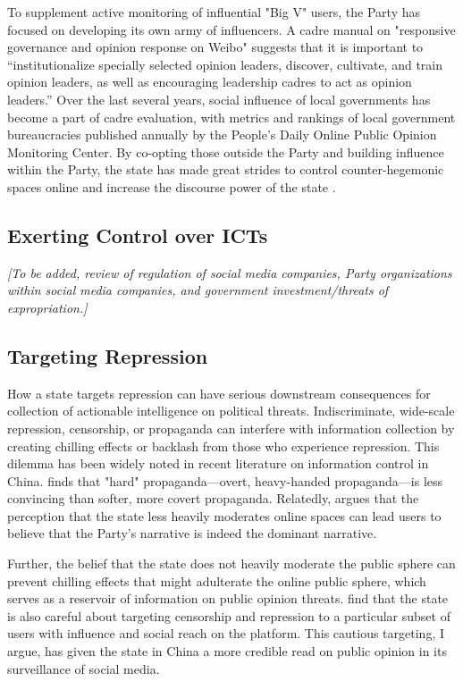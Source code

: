 \documentclass[11pt]{article}
\begin{document}
To supplement active monitoring of influential "Big V" users, the Party has focused on developing its own army of influencers. A cadre manual on "responsive governance and opinion response on Weibo" suggests that it is important to ``institutionalize specially selected opinion leaders, discover, cultivate, and train opinion leaders, as well as encouraging leadership cadres to act as opinion leaders.'' Over the last several years, social influence of local governments has become a part of cadre evaluation, with metrics and rankings of local government bureaucracies published annually by the People’s Daily Online Public Opinion Monitoring Center. By co-opting those outside the Party and building influence within the Party, the state has made great strides to control counter-hegemonic spaces online and increase the discourse power of the state \citep{gallagher2019who}.

\subsection{Exerting Control over ICTs}

{\it [To be added, review of regulation of social media companies, Party organizations within social media companies, and government investment/threats of expropriation.]}

\subsection{Targeting Repression}

How a state targets repression can have serious downstream consequences for collection of actionable intelligence on political threats. Indiscriminate, wide-scale repression, censorship, or propaganda can interfere with information collection by creating chilling effects or backlash from those who experience repression. This dilemma has been widely noted in recent literature on information control in China. \cite{huang2018pathology} finds that "hard" propaganda—overt, heavy-handed propaganda—is less convincing than softer, more covert propaganda. Relatedly, \cite{han2018contesting} argues that the perception that the state less heavily moderates online spaces can lead users to believe that the Party's narrative is indeed the dominant narrative.

Further, the belief that the state does not heavily moderate the public sphere can prevent chilling effects that might adulterate the online public sphere, which serves as a reservoir of information on public opinion threats. \cite{gallagher2021not} find that the state is also careful about targeting censorship and repression to a particular subset of users with influence and social reach on the platform. This cautious targeting, I argue, has given the state in China a more credible read on public opinion in its surveillance of social media. 
\end{document}
